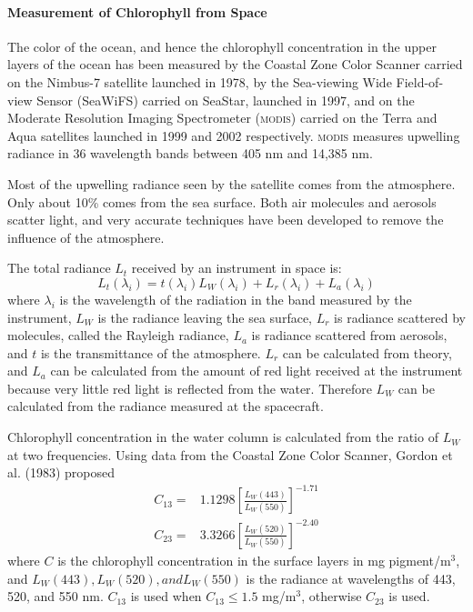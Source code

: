 \paragraph{Measurement of Chlorophyll from Space}%
The color of the ocean, and
hence the chlorophyll concentration in the upper layers of the ocean
has been measured by the Coastal Zone Color Scanner carried on the
Nimbus-7 satellite launched in 1978, by the Sea-viewing Wide
Field-of-view Sensor (SeaWiFS) carried on SeaStar, launched in 1997,
and on the Moderate Resolution Imaging Spectrometer
(\textsc{modis}) carried on the Terra and Aqua satellites launched in
1999 and 2002 respectively. \textsc{modis} measures
upwelling radiance in 36 wavelength bands
between 405 nm and 14,385 nm.

Most of the upwelling radiance seen by the satellite comes from the
atmosphere. Only about 10\% comes from the sea surface. Both air
molecules and aerosols scatter light, and very accurate techniques
have been developed to remove the influence of the atmosphere.

The total radiance $L_t$ received by an instrument in space is:
\begin{equation}
L_t(\lambda_i) = t(\lambda_i)L_W(\lambda_i)+L_r(\lambda_i)+L_a(\lambda_i)
\end{equation}
where $\lambda_i$ is the wavelength of the radiation in the band
measured by the instrument, $L_W$ is the radiance leaving the sea
surface, $L_r$ is radiance scattered by molecules, called the Rayleigh
radiance, $L_a$ is radiance scattered from aerosols, and $t$ is the
transmittance of the atmosphere. $L_r$ can be calculated from theory,
and $L_a$ can be calculated from the amount of red light received at
the instrument because very little red light is reflected from the
water. Therefore $L_W$ can be calculated from the radiance measured at
the spacecraft.

Chlorophyll concentration in the water column is calculated from the ratio of
$L_W$ at two frequencies. Using data from the Coastal Zone Color
Scanner, Gordon et al. (1983) proposed
\begin{subequations}
\begin{align}
C_{13} = & 1.1298 \left[ \frac{L_W(443)}{L_W(550)}\right]^{-1.71}\\
C_{23} = & 3.3266 \left[ \frac{L_W(520)}{L_W(550)}\right]^{-2.40}
\end{align}
\end{subequations}
where $C$ is the chlorophyll concentration in the surface layers in mg
pigment/m$^3$, and $L_W(443), L_W(520), and L_W(550)$ is the radiance
at wavelengths of 443, 520, and 550 nm.  $C_{13}$ is used when $C_{13}
\le 1.5$ mg/m$^3$, otherwise $C_{23}$ is used.

